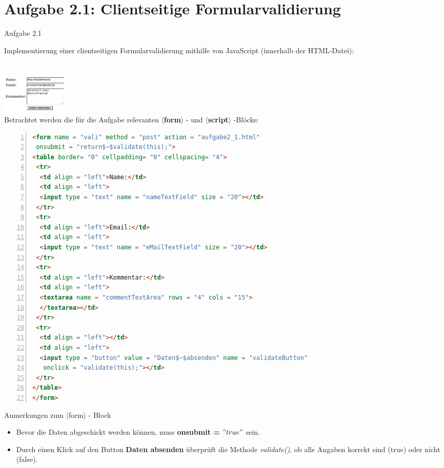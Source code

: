 \section{Aufgabe 2.1: Clientseitige Formularvalidierung}
\begin{frame}{Aufgabe 2.1}
\begin{center}
Implementierung einer clientseitigen Formularvalidierung mithilfe von JavaScript (innerhalb der HTML-Datei):\\
~\\~\\
\includegraphics[width = 120px]{../A1/src/formvali.png}
\\
Betrachtet werden die für die Aufgabe relevanten $\langle${\bf form}$\rangle$ - und $\langle${\bf script}$\rangle$ -Blöcke:
\end{center}
\end{frame}


\tiny{\begin{lstlisting}[language = HTML,
				   mathescape = true, 
                   morekeywords = {onsubmit, onclick, this, return}, 
                   numbers = left, 
                   numbersep = 3pt]
 <form name = "vali" method = "post" action = "aufgabe2_1.html"
 onsubmit = "return$~$validate(this);">
<table border= "0" cellpadding= "0" cellspacing= "4">
 <tr>
  <td align = "left">Name:</td>
  <td align = "left">
  <input type = "text" name = "nameTextField" size = "20"></td>
 </tr>
 <tr>
  <td align = "left">Email:</td>
  <td align = "left">
  <input type = "text" name = "eMailTextField" size = "20"></td>
 </tr>
 <tr>
  <td align = "left">Kommentar:</td>
  <td align = "left">
  <textarea name = "commentTextArea" rows = "4" cols = "15">
  </textarea></td>
 </tr>
 <tr>
  <td align = "left"></td>
  <td align = "left">
  <input type = "button" value = "Daten$~$absenden" name = "validateButton" 
   onclick = "validate(this);"></td>
 </tr>
</table>
</form>
\end{lstlisting}}

\begin{frame}{Anmerkungen zum $\langle$form$\rangle$ - Block}
\normalsize{
\begin{itemize}
\item Bevor die Daten abgeschickt werden können, muss {\bf onsubmit = $"true"$} sein.
\item Durch einen Klick auf den Button {\bf Daten absenden} überprüft die Methode {\it validate()}, ob alle Angaben korrekt sind (true) oder nicht (false).
\end{itemize}}
\end{frame}

